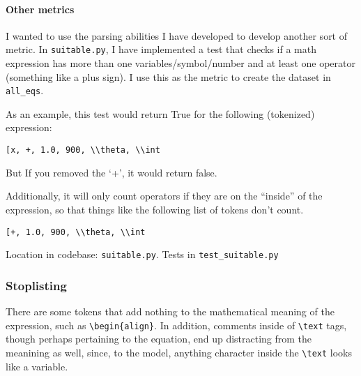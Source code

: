 \documentclass[]{article}
\let\oldparagraph\paragraph
\renewcommand{\paragraph}[1]{\oldparagraph{#1}\mbox{}}
\begin{document}
\hypertarget{other-metrics}{%
\paragraph{Other metrics}\label{other-metrics}}

I wanted to use the parsing abilities I have developed to develop
another sort of metric. In \texttt{suitable.py}, I have implemented a
test that checks if a math expression has more than one
variables/symbol/number and at least one operator (something like a plus
sign). I use this as the metric to create the dataset in
\texttt{all\_eqs}.

As an example, this test would return True for the following (tokenized)
expression:

\texttt{{[}\textquotesingle{}x\textquotesingle{},\ \textquotesingle{}+\textquotesingle{},\ \textquotesingle{}1.0\textquotesingle{},\ \textquotesingle{}900\textquotesingle{},\ \textquotesingle{}\textbackslash{}\textbackslash{}theta\textquotesingle{},\ \textquotesingle{}\textbackslash{}\textbackslash{}int\textquotesingle{}{]}}

But If you removed the `+', it would return false.

Additionally, it will only count operators if they are on the ``inside''
of the expression, so that things like the following list of tokens
don't count.

\texttt{{[}\textquotesingle{}+\textquotesingle{},\ \textquotesingle{}1.0\textquotesingle{},\ \textquotesingle{}900\textquotesingle{},\ \textquotesingle{}\textbackslash{}\textbackslash{}theta\textquotesingle{},\ \textquotesingle{}\textbackslash{}\textbackslash{}int\textquotesingle{}{]}}

Location in codebase: \texttt{suitable.py}. Tests in
\texttt{test\_suitable.py}

\hypertarget{stoplisting}{%
\subsubsection{Stoplisting}\label{stoplisting}}

There are some tokens that add nothing to the mathematical meaning of
the expression, such as \texttt{\textbackslash{}begin\{align\}}. In
addition, comments inside of \texttt{\textbackslash{}text} tags, though
perhaps pertaining to the equation, end up distracting from the
meanining as well, since, to the model, anything character inside the
\texttt{\textbackslash{}text} looks like a variable.
\end{document}
